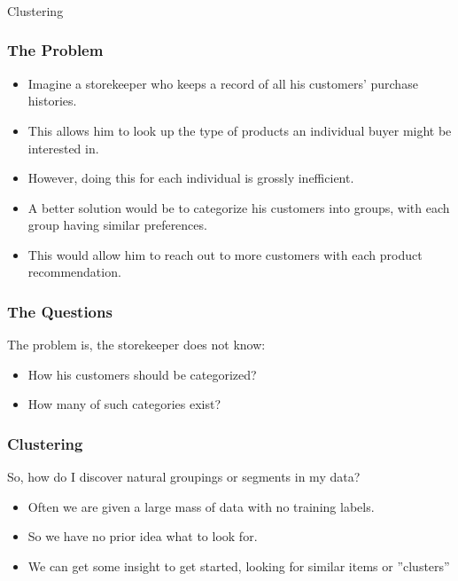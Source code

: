 \begin{frame}[fragile]\frametitle{}
\begin{center}
{\Large Clustering}
\end{center}
\end{frame}

\begin{frame}[fragile]\frametitle{The Problem}
\begin{itemize}
\item Imagine a storekeeper who keeps a record of all his customers' purchase histories. 
\item This allows him to look up the type of products an individual buyer might be interested in. 
\item However, doing this for each individual is grossly inefficient. 
\item A better solution would be to categorize his customers into groups, with each group having similar preferences. 
\item This would allow him to reach out to more customers with each product recommendation.
\end{itemize}
\end{frame}

\begin{frame}[fragile]\frametitle{The Questions}
The problem is, the storekeeper does not know:
\begin{itemize}
\item How his customers should be categorized?
\item How many of such categories exist?
\end{itemize}
\end{frame}

\begin{frame}[fragile]\frametitle{Clustering}
So, how do I discover natural groupings or segments in my data?
\begin{itemize}
\item Often we are given a large mass of data with no training labels. 
\item So we have no prior idea what to look for.
\item We can get some insight to get started, looking for similar items or ''clusters''
\end{itemize}
\end{frame}


